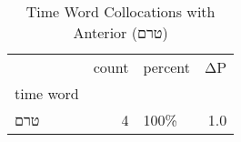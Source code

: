 \begin{table}[htbp!]
\centering
\caption{Time Word Collocations with Anterior (טרם)}
\label{table:antטרם_head_cpd}
\begin{tabular}{lrlr}
\toprule
{} &  count & percent &   ΔP \\
time word &        &         &      \\
\midrule
טרם       &      4 &    100\% &  1.0 \\
\bottomrule
\end{tabular}
\end{table}
